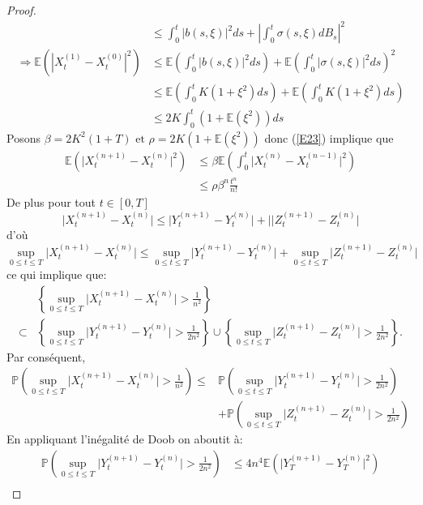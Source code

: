 \documentclass[A4paper,12pt]{report}
\newcommand{\E}{{\mathbb{E}}}
\newcommand{\pr}{{\mathbb{P}}}
\begin{document}
\begin{proof}
\begin{align*}
&\leq \int_{0}^{t}|b(s, \xi)|^2ds + \left|\int_{0}^{t}\sigma(s, \xi)dB_s\right|^2\\
\Rightarrow \E\left(\left|X_{t}^{(1)}-X_{t}^{(0)}\right|^{2}\right) &\leq \E\left(\int_{0}^{t}|b(s, \xi)|^2ds\right) + \E\left(\int_{0}^{t}|\sigma(s, \xi)|^2ds\right)^2\\
&\leq\E\left(\int_{0}^{t} K(1+\xi^2)ds \right) +\E\left(\int_{0}^{t} K(1+\xi^2)ds \right)\\
&\leq 2K\int_{0}^{t} (1+\E(\xi^2))ds 
\end{align*}
Posons $\beta = 2K^2(1+T)\text{ et } \rho =2K(1+\E(\xi^2))$ donc (\ref{E23}) implique que
\begin{align*}
\E\left(\lvert X_{t}^{(n+1)}-X_{t}^{(n)}\rvert^{2}\right) &\leq \beta \E\left(\int_{0}^{t}\lvert X_{t}^{(n)}-X_{t}^{(n-1)}\rvert^{2}\right)\\
&\leq \rho \beta^n \frac{t^n}{n!}
\end{align*}
De plus pour tout $t \in[0, T]$
$$
\lvert X_{t}^{(n+1)}-X_{t}^{(n)}\rvert \leq \lvert Y_{t}^{(n+1)}-Y_{t}^{(n)}\rvert+ \lvert|Z_{t}^{(n+1)}-Z_{t}^{(n)}\rvert
$$
d'où
$$
\sup _{0 \leq t \leq T}\lvert X_{t}^{(n+1)}-X_{t}^{(n)}\rvert \leq \sup _{0 \leq t \leq T}\lvert Y_{t}^{(n+1)}-Y_{t}^{(n)}\rvert + \sup _{0 \leq t \leq T}\lvert Z_{t}^{(n+1)}-Z_{t}^{(n)}\rvert
$$
ce qui implique que:
$$
\begin{aligned}
& \left\{\sup _{0 \leq t \leq T}\lvert X_{t}^{(n+1)}-X_{t}^{(n)}\rvert>\frac{1}{n^{2}}\right\} \\
\subset & \left\{\sup _{0 \leq t \leq T}\lvert Y_{t}^{(n+1)}-Y_{t}^{(n)}\rvert >\frac{1}{2 n^{2}}\right\} \cup\left\{\sup _{0 \leq t \leq T}\lvert Z_{t}^{(n+1)}-Z_{t}^{(n)}\rvert >\frac{1}{2 n^{2}}\right\} .
\end{aligned}
$$
Par conséquent,
$$
\begin{aligned}
\pr \left(\sup _{0 \leq t \leq T}\lvert X_{t}^{(n+1)}-X_{t}^{(n)}\rvert >\frac{1}{n^{2}}\right) \leq & \pr\left(\sup _{0 \leq t \leq T}\lvert Y_{t}^{(n+1)}-Y_{t}^{(n)}\rvert >\frac{1}{2 n^{2}}\right) \\
& +\pr\left(\sup _{0 \leq t \leq T}\lvert Z_{t}^{(n+1)}-Z_{t}^{(n)}\rvert >\frac{1}{2 n^{2}}\right)
\end{aligned}
$$
En appliquant l'inégalité de Doob on aboutit à:
$$
\begin{aligned}
\pr\left(\sup _{0 \leq t \leq T}\lvert Y_{t}^{(n+1)}-Y_{t}^{(n)}\rvert >\frac{1}{2 n^{2}}\right) & \leq 4n^{4} \E\left(\lvert Y_{T}^{(n+1)}-Y_{T}^{(n)}\rvert^{2}\right)\\

\end{aligned}$$
\end{proof}
\end{document}
